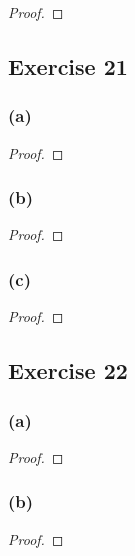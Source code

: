 \documentclass[14pt]{extarticle}
\begin{document}
\begin{proof}

\end{proof}

\subsection{Exercise 21}

\subsubsection{(a)}

\begin{proof}

\end{proof}

\subsubsection{(b)}

\begin{proof}

\end{proof}

\subsubsection{(c)}

\begin{proof}

\end{proof}

\subsection{Exercise 22}

\subsubsection{(a)}

\begin{proof}

\end{proof}

\subsubsection{(b)}

\begin{proof}

\end{proof}
\end{document}
